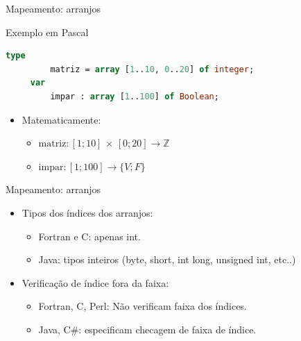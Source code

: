 \documentclass[handout]{beamer}
\begin{document}
\begin{frame}[fragile]{Mapeamento: arranjos}

\begin{block}{Exemplo em Pascal}
	\begin{lstlisting}[language=Pascal,numbers=none]
     type
         matriz = array [1..10, 0..20] of integer;
     var
         impar : array [1..100] of Boolean;
   \end{lstlisting}
\end{block}

\begin{itemize}
   \item Matematicamente:
   \begin{itemize}
      \item $\mathrm{matriz}: [1; 10]\, \times\, [0; 20] \rightarrow \mathbb{Z}$
      \item $\mathrm{impar}: [1; 100] \rightarrow \{V; F\}$
   \end{itemize}
\end{itemize}

\end{frame}

\begin{frame}[fragile]{Mapeamento: arranjos}
\begin{itemize}
    \item Tipos dos índices dos arranjos:
    \begin{itemize}
        \item Fortran e C: apenas int.
        \item Java: tipos inteiros (byte, short, int long, unsigned int, etc..)
    \end{itemize}
    \item Verificação de índice fora da faixa:
    \begin{itemize}
        \item Fortran, C, Perl: Não verificam faixa dos índices.
        \item Java, C\#: especificam checagem de faixa de índice.
    \end{itemize}
\end{itemize}
\end{frame}
\end{document}

